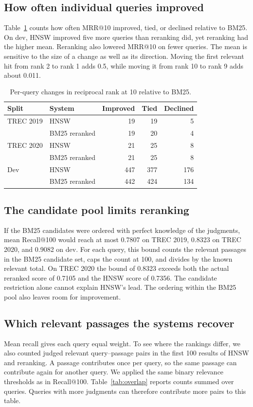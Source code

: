 \documentclass[11pt,letterpaper]{article}
\begin{document}
\subsection{How often individual queries improved}
Table~\ref{tab:paired} counts how often MRR@10 improved, tied, or declined relative to BM25. On dev, HNSW improved five more queries than reranking did, yet reranking had the higher mean. Reranking also lowered MRR@10 on fewer queries. The mean is sensitive to the size of a change as well as its direction. Moving the first relevant hit from rank 2 to rank 1 adds 0.5, while moving it from rank 10 to rank 9 adds about 0.011.

\begin{table}[H]
\centering
\caption{Per-query changes in reciprocal rank at 10 relative to BM25.}
\label{tab:paired}
\begin{tabular}{llrrr}
\toprule
Split & System & Improved & Tied & Declined\\
\midrule
TREC 2019 & HNSW & 19 & 19 & 5\\
          & BM25 reranked & 19 & 20 & 4\\
TREC 2020 & HNSW & 21 & 25 & 8\\
          & BM25 reranked & 21 & 25 & 8\\
Dev       & HNSW & 447 & 377 & 176\\
          & BM25 reranked & 442 & 424 & 134\\
\bottomrule
\end{tabular}
\end{table}

\subsection{The candidate pool limits reranking}
If the BM25 candidates were ordered with perfect knowledge of the judgments, mean Recall@100 would reach at most 0.7807 on TREC 2019, 0.8323 on TREC 2020, and 0.9082 on dev. For each query, this bound counts the relevant passages in the BM25 candidate set, caps the count at 100, and divides by the known relevant total. On TREC 2020 the bound of 0.8323 exceeds both the actual reranked score of 0.7105 and the HNSW score of 0.7356. The candidate restriction alone cannot explain HNSW's lead. The ordering within the BM25 pool also leaves room for improvement.

\newpage
\subsection{Which relevant passages the systems recover}
Mean recall gives each query equal weight. To see where the rankings differ, we also counted judged relevant query--passage pairs in the first 100 results of HNSW and reranking. A passage contributes once per query, so the same passage can contribute again for another query. We applied the same binary relevance thresholds as in Recall@100. Table~\ref{tab:overlap} reports counts summed over queries. Queries with more judgments can therefore contribute more pairs to this table.
\end{document}
